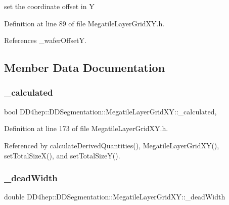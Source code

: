 set the coordinate offset in Y 



Definition at line 89 of file Megatile\+Layer\+Grid\+X\+Y.\+h.



References \+\_\+wafer\+OffsetY.



\subsection{Member Data Documentation}
\hypertarget{class_d_d4hep_1_1_d_d_segmentation_1_1_megatile_layer_grid_x_y_a3330c7077781b90cd4d8a780de205960}{}\label{class_d_d4hep_1_1_d_d_segmentation_1_1_megatile_layer_grid_x_y_a3330c7077781b90cd4d8a780de205960} 
\subsubsection{\texorpdfstring{\+\_\+calculated}{\_calculated}}
{\footnotesize\ttfamily bool D\+D4hep\+::\+D\+D\+Segmentation\+::\+Megatile\+Layer\+Grid\+X\+Y\+::\+\_\+calculated\hspace{0.3cm}{\ttfamily [mutable]}, {\ttfamily [protected]}}



Definition at line 173 of file Megatile\+Layer\+Grid\+X\+Y.\+h.



Referenced by calculate\+Derived\+Quantities(), Megatile\+Layer\+Grid\+X\+Y(), set\+Total\+Size\+X(), and set\+Total\+Size\+Y().

\hypertarget{class_d_d4hep_1_1_d_d_segmentation_1_1_megatile_layer_grid_x_y_ab000179caddbb6a3ae67595b9bf87ba4}{}\label{class_d_d4hep_1_1_d_d_segmentation_1_1_megatile_layer_grid_x_y_ab000179caddbb6a3ae67595b9bf87ba4} 
\subsubsection{\texorpdfstring{\+\_\+dead\+Width}{\_deadWidth}}
{\footnotesize\ttfamily double D\+D4hep\+::\+D\+D\+Segmentation\+::\+Megatile\+Layer\+Grid\+X\+Y\+::\+\_\+dead\+Width\hspace{0.3cm}{\ttfamily [protected]}}



